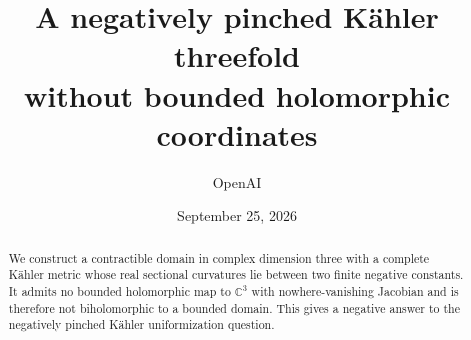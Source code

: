 \documentclass[11pt]{article}
\title{A negatively pinched K\"ahler threefold\\without bounded holomorphic coordinates}
\author{OpenAI}
\date{September 25, 2026}
\theoremstyle{definition}
\theoremstyle{remark}
\numberwithin{equation}{section}
\begin{document}
\maketitle
\begin{abstract}
We construct a contractible domain in complex dimension three with a
complete K\"ahler metric whose real sectional curvatures lie between two
finite negative constants. It admits no bounded holomorphic map to
$\mathbb C^3$ with nowhere-vanishing Jacobian and is therefore not
biholomorphic to a bounded domain. This gives a negative answer to the
negatively pinched K\"ahler uniformization question.
\end{abstract}
\setcounter{tocdepth}{1}
\tableofcontents
\clearpage












\end{document}
